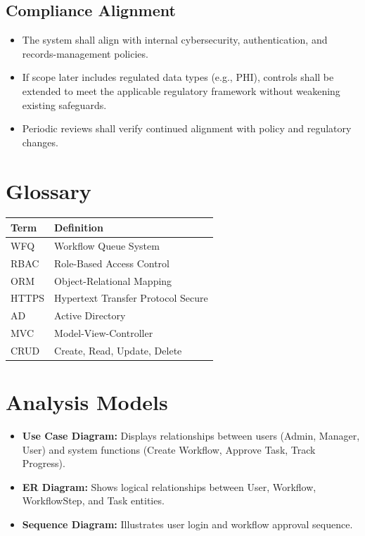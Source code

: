 \documentclass[12pt]{article}
\begin{document}
\subsection{Compliance Alignment}
\begin{itemize}
    \item The system shall align with internal cybersecurity, authentication, and
    records-management policies.
    \item If scope later includes regulated data types (e.g., PHI), controls shall be extended
    to meet the applicable regulatory framework without weakening existing safeguards.
    \item Periodic reviews shall verify continued alignment with policy and regulatory changes.
\end{itemize}

\appendix
\section{Glossary}

\begin{center}
\begin{tabular}{ll}
\toprule
Term & Definition \\
\midrule
WFQ   & Workflow Queue System \\
RBAC  & Role-Based Access Control \\
ORM   & Object-Relational Mapping \\
HTTPS & Hypertext Transfer Protocol Secure \\
AD    & Active Directory \\
MVC   & Model-View-Controller \\
CRUD  & Create, Read, Update, Delete \\
\bottomrule
\end{tabular}
\end{center}

\section{Analysis Models}
\begin{itemize}
    \item \textbf{Use Case Diagram:} Displays relationships between users (Admin, Manager,
    User) and system functions (Create Workflow, Approve Task, Track Progress).
    \item \textbf{ER Diagram:} Shows logical relationships between User, Workflow,
    WorkflowStep, and Task entities.
    \item \textbf{Sequence Diagram:} Illustrates user login and workflow approval sequence.
\end{itemize}
\end{document}
